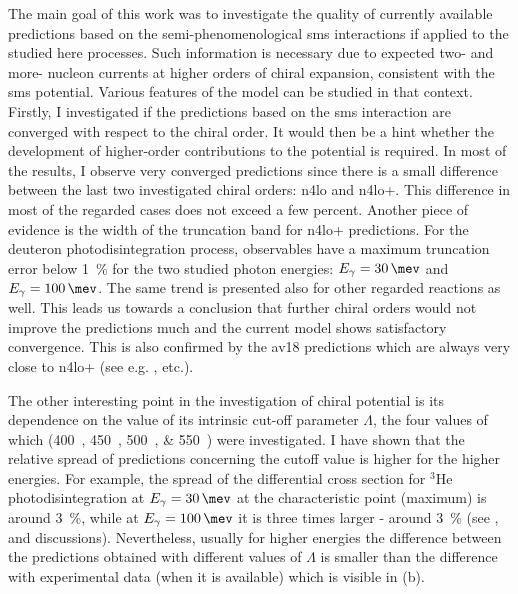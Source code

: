 The main goal of this work was to investigate the quality of currently available
predictions based on the semi-phenomenological \gls{sms}
interactions if applied to the studied here processes.
Such information is necessary due to expected two- and more- nucleon currents
at higher orders of chiral expansion, consistent with the \gls{sms} potential.
Various features of the model can be studied in that context.
Firstly, I investigated if the predictions based on the \gls{sms} interaction
are converged with respect to the chiral order.
It would then be a hint whether the development of higher-order contributions to the potential is required.
In most of the results, I observe very converged predictions since there is a small difference
between the last two investigated chiral orders: \gls{n4lo} and \gls{n4lo+}. This
difference in most of the regarded cases does not exceed a few percent.
Another piece of evidence is the width of the truncation band for \gls{n4lo+} predictions.
For the deuteron photodisintegration process, observables have a maximum
truncation error below \SI{1}{\percent} for the two studied photon energies:
$E_\gamma=\SI{30}{\mev}$ and $E_\gamma=\SI{100}{\mev}$.
The same trend is presented also for other regarded reactions as well.
This leads us towards a conclusion that further chiral orders would not
improve the predictions much and the current model shows satisfactory convergence.
This is also confirmed by the \gls{av18} predictions which are
always very close to \gls{n4lo+} (see e.g. ,  etc.).

The other interesting point in the investigation of chiral potential is its dependence
on the value of its intrinsic cut-off parameter $\Lambda$, the four values of which (\SIlist[list-units = single]{400;450;500;550}{\mev}) 
were investigated. I have shown that the relative spread of predictions 
concerning the cutoff value is higher for the higher energies.
For example, the spread of the differential cross section for $^3$He photodisintegration
at $E_\gamma=\SI{30}{\mev}$ at the characteristic point (maximum) is around \SI{3}{\percent},
while at $E_\gamma=\SI{100}{\mev}$ it is three times larger - around \SI{3}{\percent}
(see ,  and discussions).
Nevertheless, usually for higher energies the difference between the predictions
obtained with different values of $\Lambda$ is smaller than the difference with experimental
data (when it is available) which is visible in (b).

